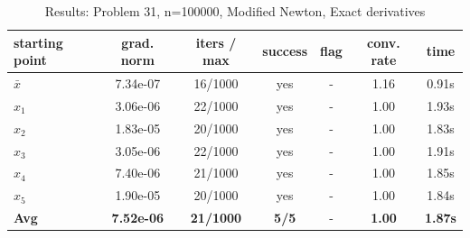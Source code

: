 \begin{longtable}{|l|c|c|c|c|c|c|}
\caption{Results: Problem 31, n=100000, Modified Newton, Exact derivatives} \\
\hline
\textbf{starting point} & \textbf{grad. norm} & \textbf{iters / max} & \textbf{success} & \textbf{flag} & \textbf{conv. rate} & \textbf{time} \\
\hline
\endfirsthead
\endhead
\endfoot
\hline
\endlastfoot
$\bar{x}$ & 7.34e-07 & 16/1000 & yes & - & 1.16 & 0.91s \\
\hline
$x_1$ & 3.06e-06 & 22/1000 & yes & - & 1.00 & 1.93s \\
\hline
$x_2$ & 1.83e-05 & 20/1000 & yes & - & 1.00 & 1.83s \\
\hline
$x_3$ & 3.05e-06 & 22/1000 & yes & - & 1.00 & 1.91s \\
\hline
$x_4$ & 7.40e-06 & 21/1000 & yes & - & 1.00 & 1.85s \\
\hline
$x_5$ & 1.90e-05 & 20/1000 & yes & - & 1.00 & 1.84s \\
\hline
\hline\hline
\textbf{Avg} & \textbf{7.52e-06} & \textbf{21/1000} & \textbf{5/5} & - & \textbf{1.00} & \textbf{1.87s} \\
\hline\hline
\end{longtable}


